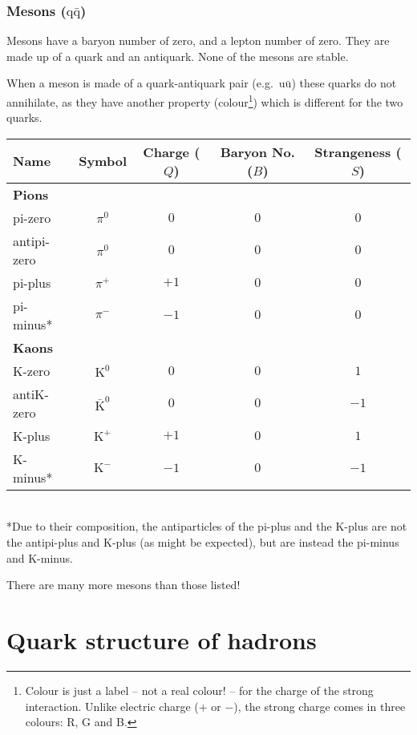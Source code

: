 \documentclass[a4paper,12pt]{article}
\begin{document}
\subsubsection{Mesons ($\mathrm{q}\bar{\mathrm{q}}$)}

Mesons have a baryon number of zero, and a lepton number of zero.  They are made up of a quark and an antiquark.  None of the mesons are stable.

When a meson is made of a quark-antiquark pair (e.g.\ $\mathrm{u}\bar{\mathrm{u}}$) these quarks do not annihilate, as they have another property (colour\footnote{Colour is just a label -- not a real colour! -- for the charge of the strong interaction.  Unlike electric charge ($+$ or $-$), the strong charge comes in three colours: R, G and B.}) which is different for the two quarks.\\

\noindent \begin{tabular}{lcccc}
\hline
\hline
Name & Symbol & Charge ($Q$) & Baryon No. ($B$) & Strangeness ($S$)\\
\hline
{\bf Pions} \\
pi-zero & $\pi^{0}$ & $0$ & $0$ & $0$ \\
antipi-zero & $\pi^{0}$ & $0$ & $0$ & $0$ \\
pi-plus & $\pi^{+}$ & $+1$ & $0$ & $0$ \\
pi-minus* & $\pi^{-}$ & $-1$ & $0$ & $0$ \\
\hline
{\bf Kaons} \\
K-zero & $\mathrm{K}^{0}$ & $0$ & $0$ & $1$ \\
antiK-zero & $\bar{\mathrm{K}}^{0}$ & $0$ & $0$ & $-1$ \\
K-plus & $\mathrm{K}^{+}$ & $+1$ & $0$ & $1$ \\
K-minus* & $\mathrm{K}^{-}$ & $-1$ & $0$ & $-1$ \\
\hline
\hline
\end{tabular}\\
*Due to their composition, the antiparticles of the pi-plus and the K-plus are not the antipi-plus and K-plus (as might be expected), but are instead the pi-minus and K-minus.

There are many more mesons than those listed!


\section{Quark structure of hadrons}
\end{document}
